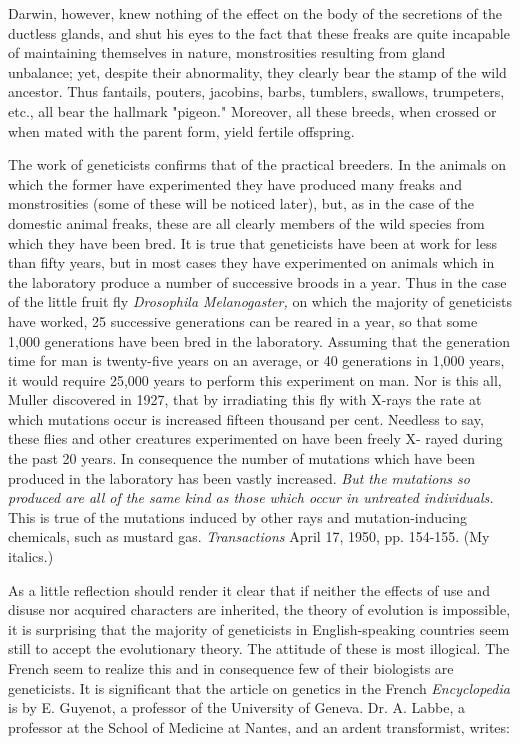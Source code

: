 Darwin, however, knew nothing of the effect on the body of the secretions of the ductless
glands, and shut his eyes to the fact that these freaks are quite incapable of maintaining
themselves in nature, monstrosities resulting from gland unbalance; yet, despite their
abnormality, they clearly bear the stamp of the wild ancestor. Thus fantails, pouters, jacobins,
barbs, tumblers, swallows, trumpeters, etc., all bear the hallmark "pigeon." Moreover, all
these breeds, when crossed or when mated with the parent form, yield fertile offspring.

The work of geneticists confirms that of the practical breeders. In the animals on which the
former have experimented they have produced many freaks and monstrosities (some of these
will be noticed later), but, as in the case of the domestic animal freaks, these are all clearly
members of the wild species from which they have been bred. It is true that geneticists have
been at work for less than fifty years, but in most cases they have experimented on animals
which in the laboratory produce a number of successive broods in a year. Thus in the case of
the little fruit fly \textit{Drosophila Melanogaster,} on which the majority of geneticists have
worked, 25 successive generations can be reared in a year, so that some 1,000 generations
have been bred in the laboratory. Assuming that the generation time for man is twenty-five
years on an average, or 40 generations in 1,000 years, it would require 25,000 years to
perform this experiment on man. Nor is this all, Muller discovered in 1927, that by
irradiating this fly with X-rays the rate at which mutations occur is increased fifteen thousand
per cent. Needless to say, these flies and other creatures experimented on have been freely X-
rayed during the past 20 years. In consequence the number of mutations which have been
produced in the laboratory has been vastly increased. \textit{But the mutations so produced are all
of the same kind as those which occur in untreated individuals.} This is true of the mutations
induced by other rays and mutation-inducing chemicals, such as mustard gas. \textit{Transactions}
April 17, 1950, pp. 154-155. (My italics.)

As a little reflection should render it clear that if neither the effects of use and disuse nor
acquired characters are inherited, the theory of evolution is impossible, it is surprising that
the majority of geneticists in English-speaking countries seem still to accept the evolutionary
theory. The attitude of these is most illogical. The French seem to realize this and in
consequence few of their biologists are geneticists. It is significant that the article on genetics
in the French \textit{Encyclopedia} is by E. Guyenot, a professor of the University of Geneva. Dr. A.
Labbe, a professor at the School of Medicine at Nantes, and an ardent transformist, writes:

